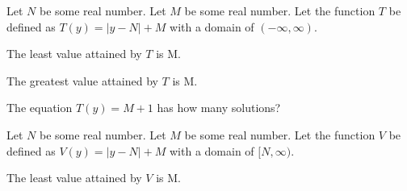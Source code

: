 \documentclass{ximera}
\begin{document}
\begin{definition}
Let $N$ be some real number.
Let $M$ be some real number.
Let the function $T$ be defined as $T(y) = |y-N|+M$ with a domain of $(-\infty, \infty)$. 

\end{definition}


\begin{exercise}
The least value attained by $T$ is M.

\begin{multipleChoice}
\end{multipleChoice}

\end{exercise}



\begin{exercise}
The greatest value attained by $T$ is M.

\begin{multipleChoice}
\end{multipleChoice}

\end{exercise}







\begin{exercise}
The equation $T(y) = M+1$ has how many solutions?

\begin{selectAll}
\end{selectAll}

\end{exercise}






\begin{definition}
Let $N$ be some real number.
Let $M$ be some real number.
Let the function $V$ be defined as $V(y) = |y-N|+M$ with a domain of $[N, \infty)$. 

\end{definition}



\begin{exercise}
The least value attained by $V$ is M.

\begin{multipleChoice}
\end{multipleChoice}

\end{exercise}
\end{document}
